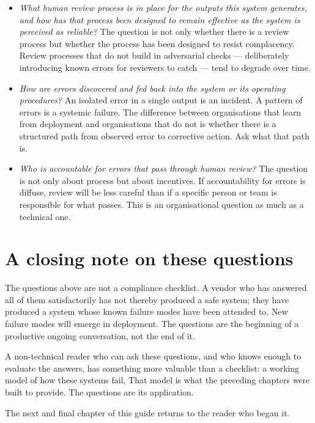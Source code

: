 \begin{itemize}
  \item \emph{What human review process is in place for
        the outputs this system generates, and how has that
        process been designed to remain effective as the
        system is perceived as reliable?} The question is
        not only whether there is a review process but
        whether the process has been designed to resist
        complacency. Review processes that do not build
        in adversarial checks --- deliberately introducing
        known errors for reviewers to catch --- tend to
        degrade over time.

  \item \emph{How are errors discovered and fed back into
        the system or its operating procedures?} An
        isolated error in a single output is an incident.
        A pattern of errors is a systemic failure. The
        difference between organisations that learn from
        deployment and organisations that do not is whether
        there is a structured path from observed error to
        corrective action. Ask what that path is.

  \item \emph{Who is accountable for errors that pass
        through human review?} The question is not only
        about process but about incentives. If accountability
        for errors is diffuse, review will be less careful
        than if a specific person or team is responsible
        for what passes. This is an organisational question
        as much as a technical one.
\end{itemize}

\section{A closing note on these questions}

The questions above are not a compliance checklist. A vendor
who has answered all of them satisfactorily has not thereby
produced a safe system; they have produced a system whose
known failure modes have been attended to. New failure modes
will emerge in deployment. The questions are the beginning
of a productive ongoing conversation, not the end of it.

A non-technical reader who can ask these questions, and who
knows enough to evaluate the answers, has something more
valuable than a checklist: a working model of how these
systems fail. That model is what the preceding chapters were
built to provide. The questions are its application.

The next and final chapter of this guide returns to the
reader who began it.
